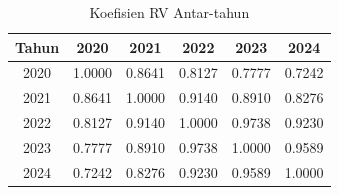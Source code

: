 \begin{table}[H]
\centering
\caption{Koefisien RV Antar-tahun} \label{tab:rv}
\begin{tabular}{|c|c|c|c|c|c|}
\hline
\textbf{Tahun} & \textbf{2020} & \textbf{2021} & \textbf{2022} & \textbf{2023} & \textbf{2024} \\
\hline
2020 & 1.0000 & 0.8641 & 0.8127 & 0.7777 & 0.7242 \\
2021 & 0.8641 & 1.0000 & 0.9140 & 0.8910 & 0.8276 \\
2022 & 0.8127 & 0.9140 & 1.0000 & 0.9738 & 0.9230 \\
2023 & 0.7777 & 0.8910 & 0.9738 & 1.0000 & 0.9589 \\
2024 & 0.7242 & 0.8276 & 0.9230 & 0.9589 & 1.0000 \\
\hline
\end{tabular}
\end{table}